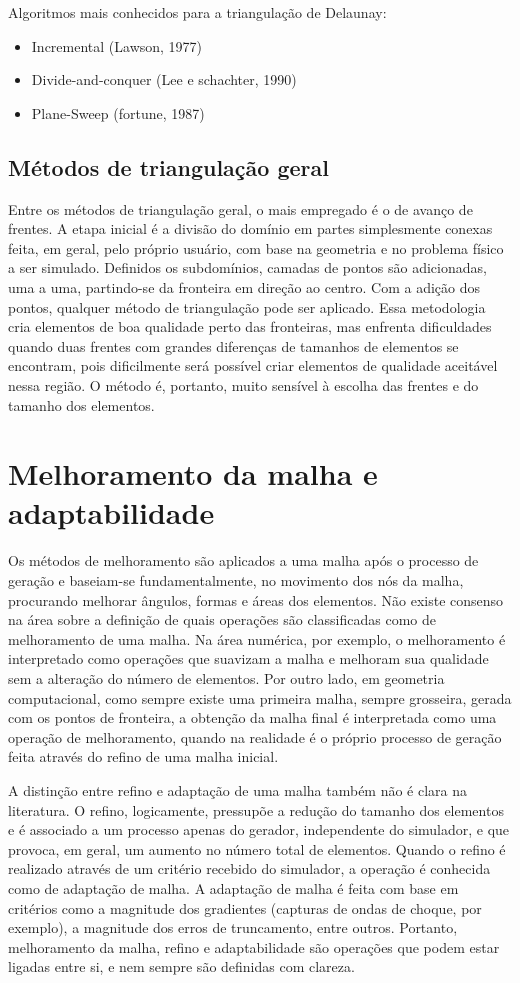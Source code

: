 Algoritmos mais conhecidos para a triangulação de Delaunay:
\begin{itemize}
    \item Incremental (Lawson, 1977)
    \item Divide-and-conquer (Lee e schachter, 1990)
    \item Plane-Sweep (fortune, 1987)
\end{itemize}

\subsection{Métodos de triangulação geral}

Entre os métodos de triangulação geral, o mais empregado é o de avanço de frentes. A etapa inicial é a divisão do domínio em partes simplesmente conexas feita, em geral, pelo próprio usuário, com base na geometria e no problema físico a ser simulado. Definidos os subdomínios, camadas de pontos são adicionadas, uma a uma, partindo-se da fronteira em direção ao centro. Com a adição dos pontos, qualquer método de triangulação pode ser aplicado. Essa metodologia cria elementos de boa qualidade perto das fronteiras, mas enfrenta dificuldades quando duas frentes com grandes diferenças de tamanhos de elementos se encontram, pois dificilmente será possível criar elementos de qualidade aceitável nessa região. O método é, portanto, muito sensível à escolha das frentes e do tamanho dos elementos.

\section{Melhoramento da malha e adaptabilidade}
Os métodos de melhoramento são aplicados a uma malha após o processo de geração e baseiam-se fundamentalmente, no movimento dos nós da malha, procurando melhorar ângulos, formas e áreas dos elementos. Não existe consenso na área sobre a definição de quais operações são classificadas como de melhoramento de uma malha. Na área numérica, por exemplo, o melhoramento é interpretado como operações que suavizam a malha e melhoram sua qualidade sem a alteração do número de elementos. Por outro lado, em geometria computacional, como sempre existe uma primeira malha, sempre grosseira, gerada com os pontos de fronteira, a obtenção da malha final é interpretada como uma operação de melhoramento, quando na realidade é o próprio processo de geração feita através do refino de uma malha inicial.

A distinção entre refino e adaptação de uma malha também não é clara na literatura. O refino, logicamente, pressupõe a redução do tamanho dos elementos e é associado a um processo apenas do gerador, independente do simulador, e que provoca, em geral, um aumento no número total de elementos.
Quando o refino é realizado através de um critério recebido do simulador, a operação é conhecida como de adaptação de malha. A adaptação de malha é feita com base em critérios como a magnitude dos gradientes (capturas de ondas de choque, por exemplo), a magnitude dos erros de truncamento, entre outros. Portanto, melhoramento da malha, refino e adaptabilidade são operações que podem estar ligadas entre si, e nem sempre são definidas com clareza.

